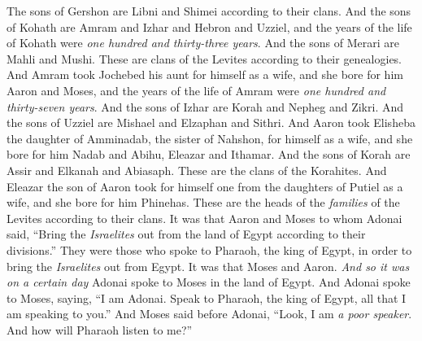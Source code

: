 \begin{biblechapter}
\verse The sons of Gershon are Libni and Shimei according to their clans.
\verse And the sons of Kohath are Amram and Izhar and Hebron and Uzziel, and the years of the life of Kohath were \textit{one hundred and thirty-three years}.
\verse And the sons of Merari are Mahli and Mushi. These are clans of the Levites according to their genealogies.
\verse And Amram took Jochebed his aunt for himself as a wife, and she bore for him Aaron and Moses, and the years of the life of Amram were \textit{one hundred and thirty-seven years}.
\verse And the sons of Izhar are Korah and Nepheg and Zikri.
\verse And the sons of Uzziel are Mishael and Elzaphan and Sithri.
\verse And Aaron took Elisheba the daughter of Amminadab, the sister of Nahshon, for himself as a wife, and she bore for him Nadab and Abihu, Eleazar and Ithamar.
\verse And the sons of Korah are Assir and Elkanah and Abiasaph. These are the clans of the Korahites.
\verse And Eleazar the son of Aaron took for himself one from the daughters of Putiel as a wife, and she bore for him Phinehas. These are the heads of the \textit{families} of the Levites according to their clans.
\verse It was that Aaron and Moses to whom Adonai said, “Bring the \textit{Israelites} out from the land of Egypt according to their divisions.”
\verse They were those who spoke to Pharaoh, the king of Egypt, in order to bring the \textit{Israelites} out from Egypt. It was that Moses and Aaron.
\verse \textit{And so it was on a certain day} Adonai spoke to Moses in the land of Egypt.
\verse And Adonai spoke to Moses, saying, “I am Adonai. Speak to Pharaoh, the king of Egypt, all that I am speaking to you.”
\verse And Moses said before Adonai, “Look, I am \textit{a poor speaker}. And how will Pharaoh listen to me?”
\end{biblechapter}

